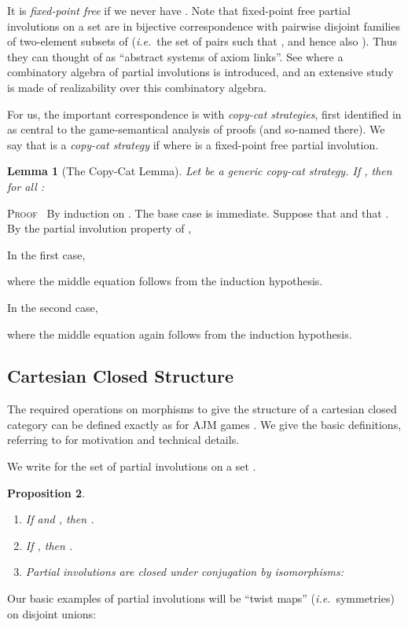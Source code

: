 \documentclass[a4paper,11pt]{article}
\newtheorem{proposition}{Proposition}[section]
\newtheorem{lemma}[proposition]{Lemma}
\newcommand{\ie}{\textit{i.e.}\ }
\newenvironment{proof}{\textsc{Proof}\ }{}
\begin{document}
It is \emph{fixed-point free} if we never have .
Note that fixed-point free partial involutions on a set  are in
bijective correspondence with pairwise disjoint families  of two-element subsets of  (\ie the set of
pairs  such that , and hence also ). Thus they can thought of as ``abstract systems of axiom links''.
See \cite{AL00,AL01} where a combinatory algebra of partial
involutions is introduced, and an extensive study is made of
realizability over this combinatory algebra.

For us, the important correspondence is with \emph{copy-cat strategies},
first  identified in \cite{AJ94a} as central to the game-semantical
analysis of proofs (and so-named there).
We say that  is a \emph{copy-cat strategy} if  where  is a fixed-point free partial involution.

\begin{lemma}[The Copy-Cat Lemma]
Let  be a generic copy-cat strategy. If , then for all
:

\end{lemma}
\begin{proof}
By induction on . The base case is immediate.
Suppose that  and that . By the partial involution property of ,

In the first case,

where the middle equation follows from the induction hypothesis.

\noindent In the second case,

where the middle equation again follows from the induction hypothesis.
\end{proof}

\subsection{Cartesian Closed Structure}
The required operations on morphisms to give the structure of a
cartesian closed category can be defined exactly as for AJM games
\cite{AJM00}. We give the basic definitions, referring to
\cite{AJM00} for motivation and technical details.

We write  for the set of partial involutions on a set .

\begin{proposition}
\begin{enumerate}
\item If  and , then .
\item If , then .
\item Partial involutions are closed under conjugation by
  isomorphisms:

\end{enumerate}
\end{proposition}
Our basic examples of partial involutions will be
``twist maps'' (\ie symmetries) on
disjoint unions:
\end{document}

